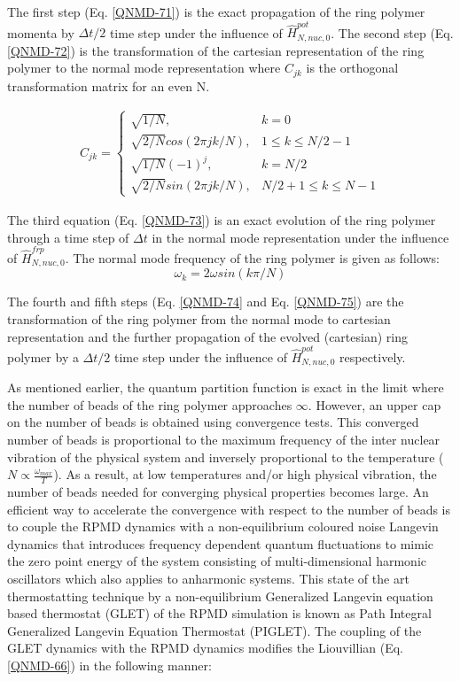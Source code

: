 \noindent The first step (Eq. \ref{QNMD-71}) is the exact propagation of the ring polymer momenta by $\Delta t/2$ time step under the influence of $\hat{H}^{pot}_{N,nuc,0}$. The second step (Eq. \ref{QNMD-72}) is the transformation of the cartesian representation of the ring polymer to the normal mode representation where $C_{jk}$ is the orthogonal transformation matrix for an even N.

\begin{align}
    C_{jk}=
    \begin{cases}
    \sqrt{1/N}, &k=0\\
    \sqrt{2/N}cos(2\pi jk/N),&1\leq k \leq N/2-1\\
    \sqrt{1/N}(-1)^j, &k=N/2\\
    \sqrt{2/N}sin(2\pi jk/N),&N/2+1\leq k \leq N-1
    \end{cases}
\end{align}


\noindent The third equation (Eq. \ref{QNMD-73}) is an exact evolution of the ring polymer through a time step of $\Delta t$ in the normal mode representation under the influence of $\hat{H}^{frp}_{N,nuc,0}$. The normal mode frequency of the ring polymer is given as follows:
\begin{equation}
 \omega_k= 2\omega sin(k\pi/N)   
\end{equation}

\noindent The fourth and fifth steps (Eq. \ref{QNMD-74} and Eq. \ref{QNMD-75}) are the transformation of the ring polymer from the normal mode to cartesian representation and the further propagation of the evolved (cartesian) ring polymer by a $\Delta t/2$ time step under the influence of $\hat{H}^{pot}_{N,nuc,0}$ respectively.

\noindent As mentioned earlier, the quantum partition function is exact in the limit where the number of beads of the ring polymer approaches $\infty$. However, an upper cap on the number of beads is obtained using convergence tests. This converged number of beads is proportional to the maximum frequency of the inter nuclear vibration of the physical system and inversely proportional to the temperature ($N \propto \frac{\omega_{max}}{T}$). As a result, at low temperatures and/or high physical vibration, the number of beads needed for converging physical properties becomes large. An efficient way to accelerate the convergence with respect to the number of beads is to couple the RPMD dynamics with a non-equilibrium coloured noise Langevin dynamics\cite{ceriotti2010novel,ceriotti2010efficient,ceriotti2012efficient} that introduces frequency dependent quantum fluctuations to mimic the zero point energy of the system consisting of multi-dimensional harmonic oscillators which also applies to anharmonic systems\cite{ceriotti2011accelerating}. This state of the art thermostatting technique by a non-equilibrium Generalized Langevin equation based thermostat (GLET) of the RPMD simulation is known as Path Integral Generalized Langevin Equation Thermostat\cite{ceriotti2012efficient} (PIGLET). The coupling of the GLET dynamics with the RPMD dynamics modifies the Liouvillian (Eq. \ref{QNMD-66}) in the following manner:  

